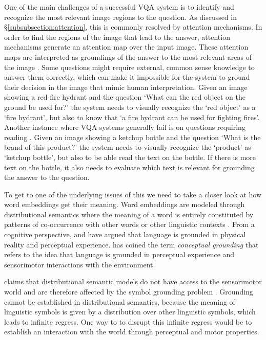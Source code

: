 \documentclass{article}
\begin{document}
One of the main challenges of a successful VQA system is to identify and recognize%
the most relevant image regions to the question. As discussed in \S \ref{subsubsection:attention}, this is commonly resolved by attention mechanisms. In order to find the regions of the image that lead to the answer, attention mechanisms generate an attention map over the input image. These attention maps are interpreted as groundings of the answer to the most relevant areas of the image \citep{zhang2019interpretable}. Some questions might require external, common sense knowledge to answer them correctly, which can make it impossible for the system to ground their decision in the image that mimic human interpretation. Given an image showing a red fire hydrant and the question `What can the red object on the ground be used for?' the system needs to visually recognize the `red object' as a `fire hydrant', but also to know that `a fire hydrant can be used for fighting fires'. Another instance where VQA systems generally fail is on questions requiring reading \citep{singh2019towards}. Given an image showing a ketchup bottle and the question `What is the brand of this product?' the system needs to visually recognize the `product' as `ketchup bottle', but also to be able read the text on the bottle. If there is more text on the bottle, it also needs to evaluate which text is relevant for grounding the answer to the question.


To get to one of the underlying issues of this we need to take a closer look at how word embeddings get their meaning. Word embeddings are modeled through distributional semantics where the meaning of a word is entirely constituted by patterns of co-occurrence with other words or other linguistic contexts \citep{baroni2016grounding}. From a cognitive perspective, \citet{barsalou1999perceptual} and \citet{fincher2001perceptual} have argued that language is grounded in physical reality and perceptual experience. \citet{barsalou2008grounded} has coined the term \textit{conceptual grounding} that refers to the idea that language is grounded in perceptual experience and sensorimotor interactions with the environment.

\citet{baroni2016grounding} claims that distributional semantic models do not have access to the sensorimotor world and are therefore affected by the symbol grounding problem \citep{harnad1990symbol}. Grounding cannot be established in distributional semantics, because the meaning of linguistic symbols is given by a distribution over other linguistic symbols, which leads to infinite regress. One way to to disrupt this infinite regress would be to establish an interaction with the world through perceptual and motor properties.
\end{document}
